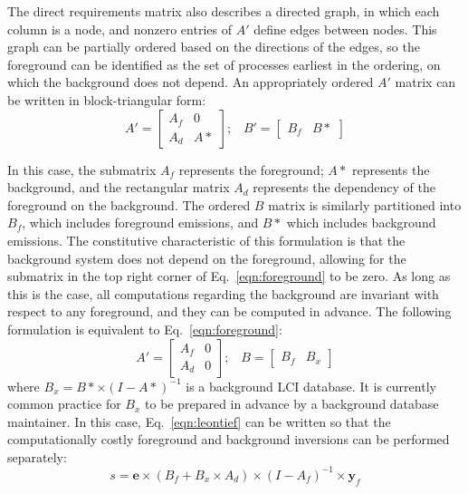 The direct requirements matrix also describes a directed graph, in which each column is a node, and nonzero entries of $A'$ define edges between nodes.  This graph can be partially ordered based on the directions of the edges, so the foreground can be identified as the set of processes earliest in the ordering, on which the background does not depend.  An appropriately ordered $A'$ matrix can be written in block-triangular form:
\begin{equation}
A' = \left[\begin{array}{cc}
A_f & 0 \\
A_d &  A*
  \end{array}
\right];\;\;\;  B' = \left[\begin{array}{cc} B_f & B*   \end{array}\right]
\label{eqn:foreground}
\end{equation}


In this case, the submatrix $A_f$ represents the foreground; $A*$ represents the background, and the rectangular matrix $A_d$ represents the dependency of the foreground on the background.  The ordered $B$ matrix is similarly partitioned into $B_f$, which includes foreground emissions, and $B*$ which includes background emissions. The constitutive characteristic of this formulation is that the background system does not depend on the foreground, allowing for the submatrix in the top right corner of Eq.~\ref{eqn:foreground} to be zero.  As long as this is the case, all computations regarding the background are invariant with respect to any foreground, and they can be computed in advance.  The following formulation is equivalent to Eq.~\ref{eqn:foreground}:
\begin{equation}
 A' = \left[\begin{array}{cc} 
A_f &  0 \\
A_d & 0 
   \end{array}\right];\;\;\;  B = \left[\begin{array}{cc} B_f & B_x \end{array}\right ]
\end{equation}
where $B_x = B* \times (I - A*)^{-1}$ is a background LCI database.  It is currently common practice for $B_x$ to be prepared in advance by a background database maintainer.  In this case, Eq.~\ref{eqn:leontief} can be written so that the computationally costly foreground and background inversions can be performed separately:
\begin{equation}
s = \mathbf{e} \times (B_f + B_x\times A_d) \times (I - A_f)^{-1} \times \mathbf{y}_f
\label{eqn:study}
\end{equation}

